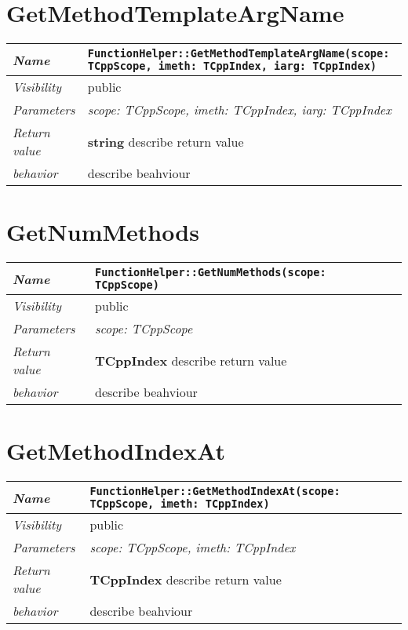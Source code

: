  \section{GetMethodTemplateArgName}
\begin{longtable}{p{3cm} @{\hskip 1cm} p{12cm}}
 \hline
\textit{Name} & \texttt{FunctionHelper::GetMethodTemplateArgName(scope: TCppScope, imeth: TCppIndex, iarg: TCppIndex)}\\
\hline
 \textit{Visibility} & public\\
\hline
\textit{Parameters} & \textit{scope: TCppScope, imeth: TCppIndex, iarg: TCppIndex}\\
\hline
\textit{Return value} & \textbf{ string} describe return value\\
  \hline
 \textit{behavior} & describe beahviour \\
\hline
\end{longtable} \pagebreak
 \section{GetNumMethods}
\begin{longtable}{p{3cm} @{\hskip 1cm} p{12cm}}
 \hline
\textit{Name} & \texttt{FunctionHelper::GetNumMethods(scope: TCppScope)}\\
\hline
 \textit{Visibility} & public\\
\hline
\textit{Parameters} & \textit{scope: TCppScope}\\
\hline
\textit{Return value} & \textbf{ TCppIndex} describe return value\\
  \hline
 \textit{behavior} & describe beahviour \\
\hline
\end{longtable} \pagebreak
 \section{GetMethodIndexAt}
\begin{longtable}{p{3cm} @{\hskip 1cm} p{12cm}}
 \hline
\textit{Name} & \texttt{FunctionHelper::GetMethodIndexAt(scope: TCppScope, imeth: TCppIndex)}\\
\hline
 \textit{Visibility} & public\\
\hline
\textit{Parameters} & \textit{scope: TCppScope, imeth: TCppIndex}\\
\hline
\textit{Return value} & \textbf{ TCppIndex} describe return value\\
  \hline
 \textit{behavior} & describe beahviour \\
\hline
\end{longtable} \pagebreak
